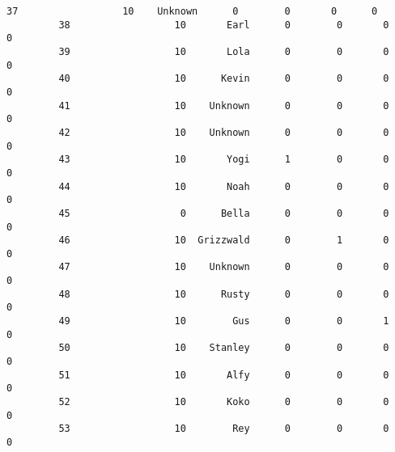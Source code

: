 \documentclass[11pt]{article}
\begin{document}
\begin{Verbatim}[commandchars=\\\{\}]
         37                  10    Unknown      0        0       0      0   
         38                  10       Earl      0        0       0      0   
         39                  10       Lola      0        0       0      0   
         40                  10      Kevin      0        0       0      0   
         41                  10    Unknown      0        0       0      0   
         42                  10    Unknown      0        0       0      0   
         43                  10       Yogi      1        0       0      0   
         44                  10       Noah      0        0       0      0   
         45                   0      Bella      0        0       0      0   
         46                  10  Grizzwald      0        1       0      0   
         47                  10    Unknown      0        0       0      0   
         48                  10      Rusty      0        0       0      0   
         49                  10        Gus      0        0       1      0   
         50                  10    Stanley      0        0       0      0   
         51                  10       Alfy      0        0       0      0   
         52                  10       Koko      0        0       0      0   
         53                  10        Rey      0        0       0      0   
         

\end{Verbatim}
\end{document}
